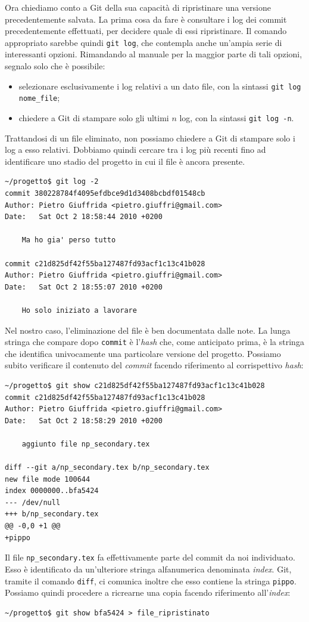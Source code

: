 \documentclass[a4paper,12pt,oneside]{article}
\begin{document}
Ora chiediamo conto a Git della sua capacità di ripristinare una versione
precedentemente salvata. La prima cosa da fare è consultare i log dei commit
precedentemente effettuati, per decidere quale di essi ripristinare. Il comando
appropriato sarebbe quindi \lstinline|git log|, che contempla anche un'ampia
serie di interessanti opzioni. Rimandando al manuale per la maggior parte di tali
opzioni, segnalo solo che è possibile:
\begin{itemize}
\item selezionare esclusivamente i log relativi a un dato file, con la
  sintassi \lstinline|git log nome_file|;
\item chiedere a Git di stampare solo gli ultimi $n$ log, con la
  sintassi \lstinline|git log -n|.
\end{itemize}
Trattandosi di un file eliminato, non possiamo chiedere a Git di stampare solo i
log a esso relativi. Dobbiamo quindi cercare tra i log più recenti fino ad
identificare uno stadio del progetto in cui il file è ancora presente.
\begin{lstlisting}
~/progetto$ git log -2
commit 380228784f4095efdbce9d1d3408bcbdf01548cb
Author: Pietro Giuffrida <pietro.giuffri@gmail.com>
Date:   Sat Oct 2 18:58:44 2010 +0200

    Ma ho gia' perso tutto

commit c21d825df42f55ba127487fd93acf1c13c41b028
Author: Pietro Giuffrida <pietro.giuffri@gmail.com>
Date:   Sat Oct 2 18:55:07 2010 +0200

    Ho solo iniziato a lavorare
\end{lstlisting}
Nel nostro caso, l'eliminazione del file è ben documentata dalle note.
La lunga stringa che compare dopo \lstinline|commit| è l'\emph{hash} che, come
anticipato prima, è la stringa che identifica univocamente una particolare
versione del progetto. Possiamo subito verificare il contenuto del \emph{commit}
facendo riferimento al corrispettivo \emph{hash}:
\begin{lstlisting}
~/progetto$ git show c21d825df42f55ba127487fd93acf1c13c41b028
commit c21d825df42f55ba127487fd93acf1c13c41b028
Author: Pietro Giuffrida <pietro.giuffri@gmail.com>
Date:   Sat Oct 2 18:58:29 2010 +0200

    aggiunto file np_secondary.tex

diff --git a/np_secondary.tex b/np_secondary.tex
new file mode 100644
index 0000000..bfa5424
--- /dev/null
+++ b/np_secondary.tex
@@ -0,0 +1 @@
+pippo
\end{lstlisting}
Il file \lstinline|np_secondary.tex| fa effettivamente parte del commit da noi
individuato. Esso è identificato da un'ulteriore stringa alfanumerica
denominata \emph{index}. Git, tramite il comando \lstinline|diff|, ci comunica
inoltre che esso contiene la stringa \lstinline|pippo|.
Possiamo quindi procedere a ricrearne una copia facendo riferimento
all'\emph{index}:
\begin{lstlisting}
~/progetto$ git show bfa5424 > file_ripristinato
\end{lstlisting}
\end{document}
